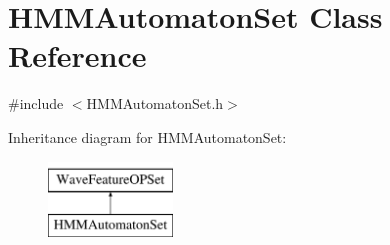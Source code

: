 \hypertarget{class_h_m_m_automaton_set}{\section{H\+M\+M\+Automaton\+Set Class Reference}
\label{class_h_m_m_automaton_set}
}


{\ttfamily \#include $<$H\+M\+M\+Automaton\+Set.\+h$>$}

Inheritance diagram for H\+M\+M\+Automaton\+Set\+:\begin{figure}[H]
\begin{center}
\leavevmode
\includegraphics[height=2.000000cm]{class_h_m_m_automaton_set}
\end{center}
\end{figure}
